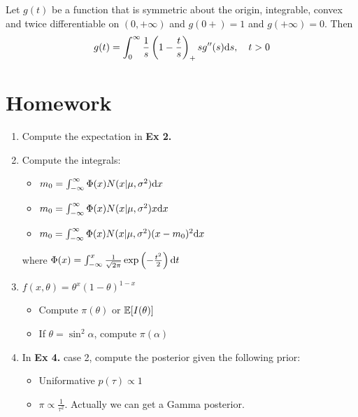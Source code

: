 	\begin{corollary}
		Let $g(t)$ be a function that is symmetric about the origin, integrable, convex and twice differentiable on $(0, +\infty)$ and $g(0+)=1$ and $g(+\infty)=0$. Then 
		$$g(t) = \int_0^\infty \frac{1}{s}\left(1-\frac{t}{s}\right)_+ s g''(s)\mathrm{d} s, \quad t>0$$
	\end{corollary}
\section{Homework}
\begin{enumerate}[(1)]
	\item Compute the expectation in \textbf{Ex 2.}
	\item Compute the integrals:
		\begin{itemize}
			\item $m_0 = \int_{-\infty}^{\infty} \Phi(x) N(x|\mu, \sigma^2)\mathrm{d} x$
			\item $m_0 = \int_{-\infty}^{\infty} \Phi(x) N(x|\mu, \sigma^2)x\mathrm{d} x$
			\item $m_0 = \int_{-\infty}^{\infty} \Phi(x) N(x|\mu, \sigma^2)(x-m_0)^2\mathrm{d} x$
		\end{itemize}
		where $\Phi(x) = \int_{-\infty}^{x} \frac{1}{\sqrt{2\pi}}\exp\left(-\frac{t^2}{2}\right)\mathrm{d} t$
	\item $f(x,\theta)= \theta^x(1-\theta)^{1-x}$
		\begin{itemize}
			\item Compute $\pi(\theta)$ or $\mathbb{E}[I(\theta)]$
			\item If $\theta = \sin^2\alpha$, compute $\pi(\alpha)$
		\end{itemize}
	\item In \textbf{Ex 4.} case 2, compute the posterior given the following prior:
		\begin{itemize}
			\item Uniformative $p(\tau)\propto 1$
			\item $\pi\propto \frac{1}{\tau^2}$. Actually we can get a Gamma posterior.
		\end{itemize}
\end{enumerate}
